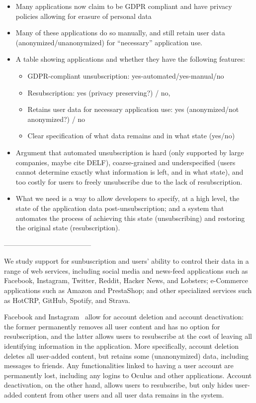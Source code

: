 \begin{itemize}
    \item Many applications now claim to be GDPR compliant and have privacy policies allowing for
    erasure of personal data 
    \item Many of these applications do so manually, and still retain user data
    (anonymized/unanonymized) for ``necessary'' application use.
    \item A table showing applications and whether they have the following features: 
    \begin{itemize}
        \item GDPR-compliant unsubscription: yes-automated/yes-manual/no
        \item Resubscription: yes (privacy preserving?) / no, 
        \item Retains user data for necessary application use: yes (anonymized/not anonymized?) / no
        \item Clear specification of what data remains and in what state (yes/no)
    \end{itemize}
    \item Argument that automated unsubscription is hard (only supported by large companies, maybe
    cite DELF), coarse-grained and underspecified (users cannot determine exactly what information
    is left, and in what state), and too costly for users to freely unsubscribe due to the lack of
    resubscription. 
    \item What we need is a way to allow developers to specify, at a high level, the state of the
    application data post-unsubscription; and a system that automates the process of achieving this
    state (unsubscribing) and restoring the original state (resubscription).
\end{itemize}

--------------------------------------

We study support for sunbuscription and users' ability to control their data in a range of web
services, including social media and news-feed applications such as Facebook, Instagram, Twitter,
Reddit, Hacker News, and Lobsters; e-Commerce applications such as Amazon and PrestaShop; and other
specialized services such as HotCRP, GitHub, Spotify, and Strava.


Facebook and Instagram~\cite{facebook:privacy} allow for account deletion and account deactivation:
the former permanently removes all user content and has no option for resubscription, and the latter
allows users to resubscribe at the cost of leaving all identifying information in the application.
More specifically, account deletion deletes all user-added content, but retains some (unanonymized)
data, including messages to friends. Any functionalities linked to having a user account are permanently lost,
including any logins to Oculus and other applications. Account deactivation, on the other hand,
allows users to resubscribe, but only hides user-added content from other users and all user data
remains in the system. 

